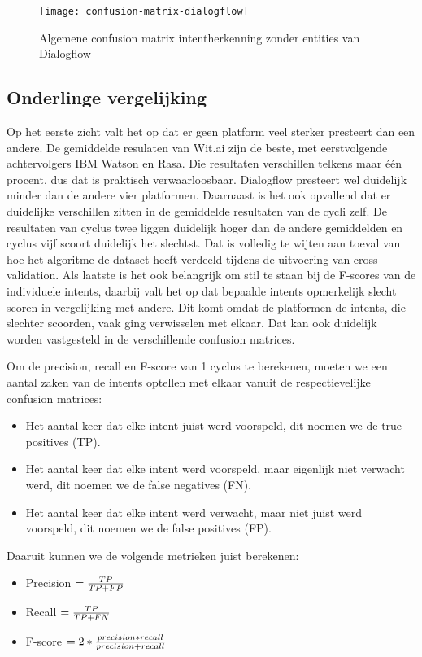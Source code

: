 \begin{figure}[H]
    \label{fig:confusion-matrix-dialogflow}
    \centering
    \texttt{[image: confusion-matrix-dialogflow]}
    \caption{Algemene confusion matrix intentherkenning zonder entities van Dialogflow}
\end{figure}

\subsection{Onderlinge vergelijking}
\label{subsec:intent-onderling}

Op het eerste zicht valt het op dat er geen platform veel sterker presteert dan een andere. De gemiddelde resulaten van Wit.ai zijn de beste, met eerstvolgende achtervolgers IBM Watson en Rasa. Die resultaten verschillen telkens maar één procent, dus dat is praktisch verwaarloosbaar. Dialogflow presteert wel duidelijk minder dan de andere vier platformen. Daarnaast is het ook opvallend dat er duidelijke verschillen zitten in de gemiddelde resultaten van de cycli zelf. De resultaten van cyclus twee liggen duidelijk hoger dan de andere gemiddelden en cyclus vijf scoort duidelijk het slechtst. Dat is volledig te wijten aan toeval van hoe het algoritme de dataset heeft verdeeld tijdens de uitvoering van cross validation. Als laatste is het ook belangrijk om stil te staan bij de F-scores van de individuele intents, daarbij valt het op dat bepaalde intents opmerkelijk slecht scoren in vergelijking met andere. Dit komt omdat de platformen de intents, die slechter scoorden, vaak ging verwisselen met elkaar. Dat kan ook duidelijk worden vastgesteld in de verschillende confusion matrices.

Om de precision, recall en F-score van 1 cyclus te berekenen, moeten we een aantal zaken van de intents optellen met elkaar vanuit de respectievelijke confusion matrices:
\begin{itemize}
    \item Het aantal keer dat elke intent juist werd voorspeld, dit noemen we de true positives (TP).
    \item Het aantal keer dat elke intent werd voorspeld, maar eigenlijk niet verwacht werd, dit noemen we de false negatives (FN).
    \item Het aantal keer dat elke intent werd verwacht, maar niet juist werd voorspeld, dit noemen we de false positives (FP).
\end{itemize}
Daaruit kunnen we de volgende metrieken juist berekenen:
\begin{itemize}
    \item Precision $= \frac{TP}{TP + FP}\\$
    \item Recall $= \frac{TP}{TP + FN}\\$
    \item F-score $= 2 * \frac{precision*recall}{precision+recall}\\$
\end{itemize}

